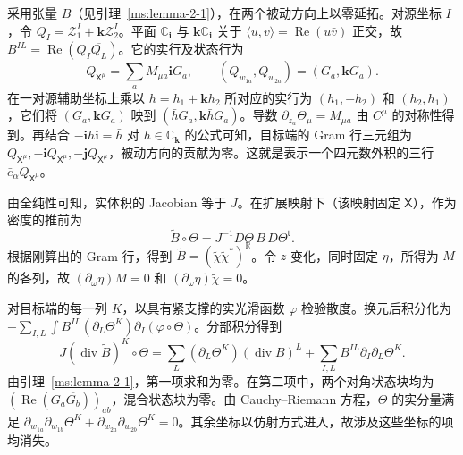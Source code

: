 采用张量 $B$（见引理~\ref{ms:lemma-2-1}），在两个被动方向上以零延拓。对源坐标 $I$，令 $Q_I=\mathcal Z_1^I+\mathbf k\mathcal Z_2^I$。平面 $\mathbb C_{\mathbf i}$ 与 $\mathbf k\mathbb C_{\mathbf i}$ 关于 $\langle u,v\rangle=\operatorname{Re}(u\bar v)$ 正交，故 $B^{IL}=\operatorname{Re}(Q_I\overline{Q_L})$。它的实行及状态行为
\[
Q_{\mathsf X^\mu}=\sum_aM_{\mu a}\mathbf i G_a,\qquad
(Q_{w_{1a}},Q_{w_{2a}})=(G_a,\mathbf k G_a).
\]
在一对源辅助坐标上乘以 $h=h_1+\mathbf k h_2$ 所对应的实行为 $(h_1,-h_2)$ 和 $(h_2,h_1)$，它们将 $(G_a,\mathbf kG_a)$ 映到 $(\bar hG_a,\mathbf k\bar hG_a)$。导数 $\partial_{z_a}\Theta_\mu=M_{\mu a}$ 由 $C^\mu$ 的对称性得到。再结合 $-\mathbf i h\mathbf i=\bar h$ 对 $h\in\mathbb C_{\mathbf k}$ 的公式可知，目标端的 Gram 行三元组为 $Q_{\mathsf X^\mu},-\mathbf iQ_{\mathsf X^\mu},-\mathbf jQ_{\mathsf X^\mu}$，被动方向的贡献为零。这就是表示一个四元数外积的三行 $\bar e_\alpha Q_{\mathsf X^\mu}$。

由全纯性可知，实体积的 Jacobian 等于 $J$。在扩展映射下（该映射固定 $\mathsf X$），作为密度的推前为
\[
\widetilde B\circ\Theta=J^{-1}D\Theta\,B\,D\Theta^{\mathsf t}.
\]
根据刚算出的 Gram 行，得到 $\widetilde B=(\widetilde\chi\widetilde\chi^*)^{\mathbb R}$。令 $z$ 变化，同时固定 $\eta$，所得为 $M$ 的各列，故 $(\partial_\omega\eta)M=0$ 和 $(\partial_\omega\eta)\widetilde\chi=0$。

对目标端的每一列 $K$，以具有紧支撑的实光滑函数 $\varphi$ 检验散度。换元后积分化为 $-\sum_{I,L}\int B^{IL}(\partial_L\Theta^K)\partial_I(\varphi\circ\Theta)$。分部积分得到
\[
J(\operatorname{div}\widetilde B)^K\circ\Theta
=\sum_L(\partial_L\Theta^K)(\operatorname{div}B)^L
 +\sum_{I,L} B^{IL}\partial_I\partial_L\Theta^K.
\]
由引理~\ref{ms:lemma-2-1}，第一项求和为零。在第二项中，两个对角状态块均为 $(\operatorname{Re}(G_a\overline{G_b}))_{ab}$，混合状态块为零。由 Cauchy--Riemann 方程，$\Theta$ 的实分量满足 $\partial_{w_{1a}}\partial_{w_{1b}}\Theta^K+\partial_{w_{2a}}\partial_{w_{2b}}\Theta^K=0$。其余坐标以仿射方式进入，故涉及这些坐标的项均消失。
